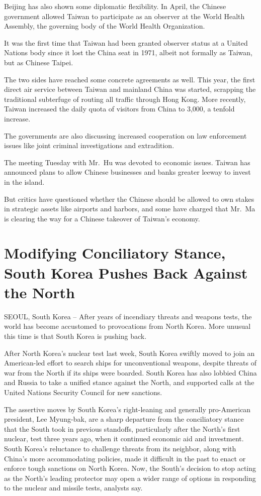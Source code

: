 \documentclass[12pt,a4paper,onecolumn]{article}
\begin{document}
Beijing has also shown some diplomatic flexibility. In April, the Chinese government allowed Taiwan
to participate as an observer at the World Health Assembly, the governing body of the World Health
Organization.

It was the first time that Taiwan had been granted observer status at a United Nations body since it
lost the China seat in 1971, albeit not formally as Taiwan, but as Chinese Taipei.

The two sides have reached some concrete agreements as well. This year, the first direct air service
between Taiwan and mainland China was started, scrapping the traditional subterfuge of routing all
traffic through Hong Kong. More recently, Taiwan increased the daily quota of visitors from China to
3,000, a tenfold increase.

The governments are also discussing increased cooperation on law enforcement issues like joint
criminal investigations and extradition.

The meeting Tuesday with Mr.~Hu was devoted to economic issues. Taiwan has announced plans to allow
Chinese businesses and banks greater leeway to invest in the island.

But critics have questioned whether the Chinese should be allowed to own stakes in strategic assets
like airports and harbors, and some have charged that Mr.~Ma is clearing the way for a Chinese
takeover of Taiwan's economy.

\section{Modifying Conciliatory Stance, South Korea Pushes Back Against the North}

SEOUL, South Korea -- After years of incendiary threats and weapons tests, the world has become
accustomed to provocations from North Korea. More unusual this time is that South Korea is pushing
back.

After North Korea's nuclear test last week, South Korea swiftly moved to join an American-led effort
to search ships for unconventional weapons, despite threats of war from the North if its ships were
boarded. South Korea has also lobbied China and Russia to take a unified stance against the North,
and supported calls at the United Nations Security Council for new sanctions.

The assertive moves by South Korea's right-leaning and generally pro-American president, Lee
Myung-bak, are a sharp departure from the conciliatory stance that the South took in previous
standoffs, particularly after the North's first nuclear, test three years ago, when it continued
economic aid and investment. South Korea's reluctance to challenge threats from its neighbor, along
with China's more accommodating policies, made it difficult in the past to enact or enforce tough
sanctions on North Korea. Now, the South's decision to stop acting as the North's leading protector
may open a wider range of options in responding to the nuclear and missile tests, analysts say.
\end{document}
